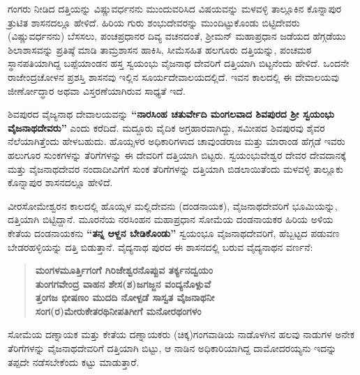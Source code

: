 ಗಂಗರು ನೀಡಿದ ದತ್ತಿಯನ್ನು ವಿಷ್ಣುವರ್ಧನನು ಮುಂದುವರಿಸಿದ ವಿಷಯವನ್ನು ಮಳವಳ್ಳಿ ತಾಲ್ಲೂಕಿನ ಕೊನ್ನಾಪುರ ತ್ರುಟಿತ ಶಾಸನದಲ್ಲೂ ಹೇಳಿದೆ. ಹಿರಿಯ ಗುರು ಶಂಭುದೇವರನ್ನು ಮುಂದಿಟ್ಟುಕೊಂಡು ಬಿಟ್ಟಿದೇವರು (ವಿಷ್ಣುವರ್ಧನನು) ಬೆಸಸಲು, ಪಂಚಪ್ರಧಾನರ ದಿವ್ಯ ವಚನದಂತೆ, ಶ‍್ರೀಮನ್​ ಮಹಾಪ್ರಧಾನ ಜಡೆಯದ ಹೆಗ್ಗಡೆಯು ಶಿಲಾಶಾಸವನ್ನು ಪ್ರತಿಷ್ಠೆ ಮಾಡಿ ತಾಮ್ರಶಾಸನ ಹಾಕಿಸಿ, ಸೀಮೆಸಹಿತ ಹಲಗೂರು ದತ್ತಿಯನ್ನು, ಪಂಚಮಠ ಸ್ಥಾನಪತಿಯಾಗಿದ್ದ ಬಪ್ಪೆಯಾಂಡನ ಹಸ್ತ ಸ್ವಯಂಭು ವೈಜನಾಥ ದೇವರಿಗೆ ದತ್ತಿಯಾಗಿ ಬಿಟ್ಟನೆಂದು ಹೇಳಿದೆ. ಒಂದನೇ ರಾಜೇಂದ್ರಚೋಳನ ಪ್ರಶಸ್ತಿ ಶಾಸನವು ಇಲ್ಲಿನ ಸೂರ್ಯದೇವಾಲಯದಲ್ಲಿದೆ. ಇವನ ಕಾಲದಲ್ಲಿ ಈ ದೇವಾಲಯವು ಜೀರ್ಣೋದ್ಧಾರ ಅಥವಾ ವಿಸ್ತರಣೆಯಾಗಿರುವ ಸಾಧ್ಯತೆ ಇದೆ.

ಶಿವಪುರದ ವೈಜ್ಯನಾಥ ದೇವಾಲಯವನ್ನು \textbf{“ನಾರಸಿಂಹ ಚತುರ್ವೇದಿ ಮಂಗಲವಾದ ಶಿವಪುರದ ಶ‍್ರೀ ಸ್ವಯಂಭು ವೈಜನಾಥದೇವರು”} ಎಂದು ಕರೆದಿದೆ. ಮದ್ದೂರು ವೈದಿಕ ಅಗ್ರಹಾರವಾಗಿದ್ದು, ಸಮೀಪದ ಶಿವಪುರವು ಶೈವರ ನೆಲೆಯಾಗಿತ್ತೆಂದು ಹೇಳಬಹುದು. ಹೊಯ್ಸಳರ ಅಧಿಕಾರಿಗಳಾದ ಚಾವುಂಡರಾಜ ಮತ್ತು ಮಾರಾಂಡ ಹೆಗ್ಗಡೆ ಇವರು ಹಲುಗೂರ ಸುಂಕಗಳನ್ನು ತೆರಿಗೆಗಳನ್ನು ಈ ದೇವರಿಗೆ ದತ್ತಿಯಾಗಿ ಬಿಟ್ಟರು. ಸ್ವಯಂಭುವೇಶ್ವರ ದೇವರ ದೇವದಾನಕ್ಕೆ ಮತ್ತು ವೈಜನಾಥದೇವರ ನಂದಾದೀವಿಗೆಗೆ ಸುಂಕ ತೆರಿಗೆಗಳನ್ನು ದತ್ತಿಯಾಗಿ ಬಿಡಲಾಯಿತೆಂದು ಮಳವಳ್ಳಿ ತಾಲ್ಲೂಕು ಕೊನ್ನಾಪುರ ಶಾಸನದಲ್ಲೂ ಹೇಳಿದೆ.

ವೀರಸೋಮೇಶ್ವರನ ಕಾಲದಲ್ಲಿ ಹೊಯ್ಸಳ ಮಲ್ಲಿದೇವನು (ದಂಡನಾಯಕ), ವೈಜನಾಥದೇವರಿಗೆ ಭೂಮಿಯನ್ನು, ದತ್ತಿಯಾಗಿ ಬಿಟ್ಟಿದ್ದಾನೆ. ಮೂರನೆಯ ನರಸಿಂಹನ ಮಹಾಪ್ರಧಾನ ಸೋಮೆಯ ದಂಡನಾಯಕರ ಹಿರಿಯ ಅಳಿಯ ಕೇತೆಯ ದಂಡನಾಯಕನು \textbf{“ತನ್ನ ಆಳ್ದನ ಬೇಡಿಕೊಂಡು”} ಸ್ವಯಂಭೂ ವೈಜನಾಥದೇವರಿಗೆ, ಹೆಬ್ಬಟ್ಟದ ಪಡುವಣ ಬೇಡರಹಳ್ಳಿಯನ್ನು ದತ್ತಿ ಬಿಡುತ್ತಾನೆ. ವೈದ್ಯನಾಥ ಪುರದ ಈ ಶಾಸನದಲ್ಲಿ ಬರುವ ವೈದ್ಯನಾಥನ ವರ್ಣನೆ:

\begin{verse}
\textbf{ಮಂಗಳಮೂರ್ತ್ತಿಗಂಗೆ ಗಿರಿಜೇಶ್ವರನೊಪ್ಪುವ ತರ್ಕ್ಯನದ್ವಯಂ} \\\textbf{ತುಂಗಗವೇಂದ್ರ ವಾಹನ ಶೇಸ(ಶ)ಜಗಜ್ಜನ ವಂದ್ಯನೊಳ್ಪುವೆ} \\\textbf{ತ್ತಂಗಜ ಭೀಷಣಂ ಮುದದಿ ನೋಳ್ಪಡೆ ಸಾಸ್ವತ ವೈಜನಾಥನೀ} \\\textbf{ಸಂಗ(ರ)ಮೇರುಕೇತರಥಿನೀಪತಿಗೀಗೆ ಮನೋರಥಂಗಳಂ }
\end{verse}

ಸೋಮೆಯ ದಣ್ನಾಯಕ ಮತ್ತು ಕೇತೆಯ ದಣ್ನಾಯಕರು (ಚಿಕ್ಕ)ಗಂಗವಾಡಿಯ ನಾಡೊಳಗಿನ ಹಲವು ನಾಡುಗಳ ಅನೇಕ ತೆರಿಗೆಗಳನ್ನು ವೈಜನಾಥದೇವರಿಗೆ ದತ್ತಿಯಾಗಿ ಬಿಟ್ಟು, ಆ ನಾಡಿನ ಅಧಿಕಾರಿಯಾಗಿದ್ದ ದಾಮೋದರಯ್ಯನು ಇದನ್ನು ತಪ್ಪದೇ ನಡೆಸಬೇಕೆಂದು ಕಟ್ಟು ಮಾಡುತ್ತಾರೆ.

